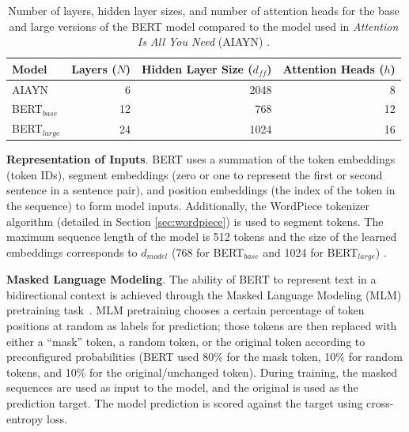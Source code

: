 \documentclass[12pt]{article}
\begin{document}
\begin{table}
    \centering
    \begin{tabular}{l r r r}
        \toprule
        Model          & Layers ($N$) & Hidden Layer Size ($d_{ff}$) & Attention Heads ($h$) \\
        \midrule
        AIAYN          & 6            & 2048                         & 8                     \\
        BERT$_{base}$  & 12           & 768                          & 12                    \\
        BERT$_{large}$ & 24           & 1024                         & 16                    \\
        \bottomrule
    \end{tabular}
    \caption{Number of layers, hidden layer sizes, and number of attention heads for the base and large versions of the BERT model
        compared to the model used in \textit{Attention Is All You Need} (AIAYN) \cite{devlin_bert_2019,vaswani_attention_2017}.}
    \label{tab:bert_params}
\end{table}

\textbf{Representation of Inputs}. BERT uses a summation of the token embeddings (token IDs), segment embeddings (zero or one to represent the first
or second sentence in a sentence pair), and position embeddings (the index of the token in the sequence) to form model inputs. Additionally, the
WordPiece tokenizer algorithm (detailed in Section \ref{sec:wordpiece}) is used to segment tokens. The maximum sequence length of the model is 512
tokens and the size of the learned embeddings corresponds to $d_{model}$ (768 for BERT$_{base}$ and 1024 for BERT$_{large}$) \cite{devlin_bert_2019}.

\textbf{Masked Language Modeling}. The ability of BERT to represent text in a bidirectional context is achieved through the Masked Language Modeling
(MLM) pretraining task~\cite{devlin_bert_2019}. MLM pretraining chooses a certain percentage of token positions at random as labels for prediction;
those tokens are then replaced with either a ``mask'' token, a random token, or the original token according to preconfigured probabilities (BERT used
80\% for the mask token, 10\% for random tokens, and 10\% for the original/unchanged token). During training, the masked sequences are used as input
to the model, and the original is used as the prediction target. The model prediction is scored against the target using cross-entropy loss.
\end{document}
